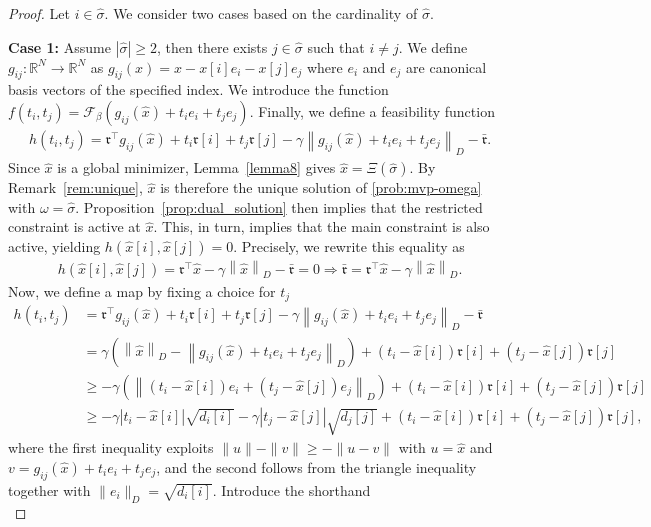 \documentclass[10pt,a4paper]{amsart}
\newcommand{\RR}{{\mathbb R}} %
\newcommand{\abs}[1]{\left\lvert#1\right\rvert}
\newcommand{\cF}{{\mathcal F}}
\newcommand{\ccr}{{\mathfrak r}}
\newcommand{\norm}[1]{\left\lVert#1\right\rVert}
\newcommand{\tpose}[1]{#1^{\top}}
\begin{document}
\begin{proof}
    Let $i\in\hat{\sigma}$. We consider two cases based on the cardinality of $\hat{\sigma}$.

    \textbf{Case 1:} Assume $\abs{\hat{\sigma}}\geq 2$, then there exists $j\in\hat{\sigma}$ such that $i\neq j$. We define $g_{ij}:\RR^N\rightarrow \RR^N$ as $g_{ij}(x)=x-x[i]e_i-x[j]e_j$ where $e_i$ and $e_j$ are canonical basis vectors of the specified index. We introduce the function $f(t_i,t_j)=\cF_\beta(g_{ij}(\hat{x})+t_ie_i+t_je_j)$. Finally, we define a feasibility function
    \begin{align*}
        h(t_i,t_j)=\tpose{\ccr}g_{ij}(\hat{x})+t_i\ccr[i]+t_j\ccr[j]-\gamma\norm{g_{ij}(\hat{x})+t_ie_i+t_je_j}_D-\bar{\ccr}.
    \end{align*}
   Since $\hat{x}$ is a global minimizer, Lemma~\ref{lemma8} gives $\hat{x}=\Xi(\hat{\sigma})$.  By Remark~\ref{rem:unique}, $\hat{x}$ is therefore the unique solution of \eqref{prob:mvp-omega} with $\omega=\hat{\sigma}$. Proposition~\ref{prop:dual_solution} then implies that the restricted constraint is active at $\hat{x}$. This, in turn,  implies that the main constraint is also active, yielding $h(\hat{x}[i],\hat{x}[j])= 0$. Precisely, we rewrite this equality as
    \begin{align*}
        h(\hat{x}[i],\hat{x}[j])=\tpose{\ccr}\hat{x}-\gamma\norm{\hat{x}}_D-\bar{\ccr}=0\Rightarrow \bar{\ccr}=\tpose{\ccr}\hat{x}-\gamma\norm{\hat{x}}_D.
    \end{align*}
    Now, we define a map by fixing a choice for $t_j$
    \begin{align*}
        h(t_i,t_j)&=\tpose{\ccr}g_{ij}(\hat{x})+t_i\ccr[i]+t_j\ccr[j]-\gamma\norm{g_{ij}(\hat{x})+t_ie_i+t_je_j}_D-\bar{\ccr}\\
        &=\gamma\left(\norm{\hat{x}}_D-\norm{g_{ij}(\hat{x})+t_ie_i+t_je_j}_D\right)+(t_i-\hat{x}[i])\ccr[i]+(t_j-\hat{x}[j])\ccr[j]\\&
        \geq-\gamma\left(\norm{(t_i-\hat{x}[i])e_i+(t_j-\hat{x}[j])e_j}_D\right)+(t_i-\hat{x}[i])\ccr[i]+(t_j-\hat{x}[j])\ccr[j]\\&
        \geq -\gamma\abs{t_i-\hat{x}[i]}\sqrt{d_i[i]}-\gamma\abs{t_j-\hat{x}[j]}\sqrt{d_j[j]}+(t_i-\hat{x}[i])\ccr[i]+(t_j-\hat{x}[j])\ccr[j] ,
    \end{align*}
    where the first inequality exploits  $\|u\|-\|v\|\geq -\|u-v\|$ with $u=\hat x$ and $v=g_{ij}(\hat x)+ t_i e_i+t_je_j$, and the second follows from the triangle inequality together with $\|e_i\|_D=\sqrt{d_i[i]}$. Introduce the shorthand  \[
\]
\end{proof}
\end{document}
